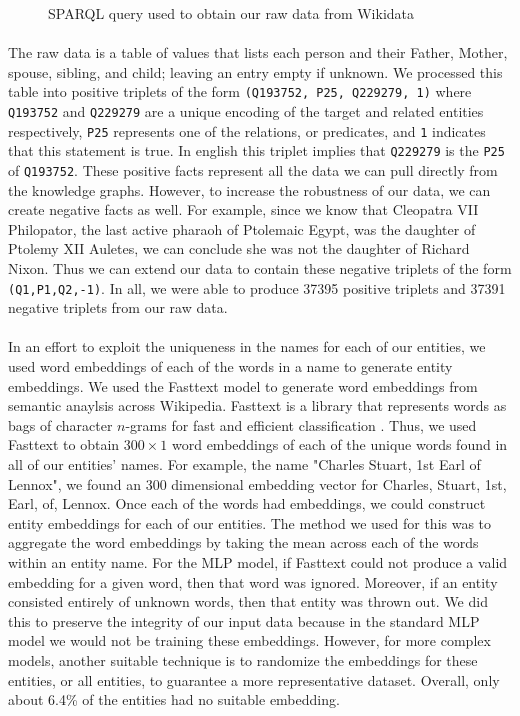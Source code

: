 \documentclass[11.5pt]{article}
\begin{document}
\begin{figure}[h!]
 
 \caption{\small SPARQL query used to obtain our raw data from Wikidata}
 \label{query}
\end{figure}


\paragraph{} The raw data is a table of values that lists each person and their Father, Mother, spouse, sibling, and child; leaving an entry empty if unknown. We processed this table into positive triplets of the form \texttt{(Q193752, P25, Q229279, 1)} where \texttt{Q193752} and \texttt{Q229279} are a unique encoding of the target and related entities respectively, \texttt{P25} represents one of the relations, or predicates, and \texttt{1} indicates that this statement is true. In english this triplet implies that \texttt{Q229279} is the \texttt{P25} of \texttt{Q193752}. These positive facts represent all the data we can pull directly from the knowledge graphs. However, to increase the robustness of our data, we can create negative facts as well. For example, since we know that Cleopatra VII Philopator, the last active pharaoh of Ptolemaic Egypt, was the daughter of Ptolemy XII Auletes, we can conclude she was not the daughter of Richard Nixon. Thus we can extend our data to contain these negative triplets of the form \texttt{(Q1,P1,Q2,-1)}. In all, we were able to produce 37395 positive triplets and 37391 negative triplets from our raw data. 

\paragraph{} In an effort to exploit the uniqueness in the names for each of our entities, we used word embeddings of each of the words in a name to generate entity embeddings. We used the Fasttext model to generate word embeddings from semantic anaylsis across Wikipedia. Fasttext is a library that represents words as bags of character $n$-grams for fast and efficient classification \cite{BojanowskiGJM16,JoulinGBM16}. Thus, we used Fasttext to obtain $300\times 1$ word embeddings of each of the unique words found in all of our entities' names. For example, the name "Charles Stuart, 1st Earl of Lennox", we found an 300 dimensional embedding vector for Charles, Stuart, 1st, Earl, of, Lennox. Once each of the words had embeddings, we could construct entity embeddings for each of our entities. The method we used for this was to aggregate the word embeddings by taking the mean across each of the words within an entity name. For the MLP model, if Fasttext could not produce a valid embedding for a given word, then that word was ignored. Moreover, if an entity consisted entirely of unknown words, then that entity was thrown out. We did this to preserve the integrity of our input data because in the standard MLP model we would not be training these embeddings. However, for more complex models, another suitable technique is to randomize the embeddings for these entities, or all entities, to guarantee a more representative dataset. Overall, only about 6.4\% of the entities had no suitable embedding. 
\end{document}
